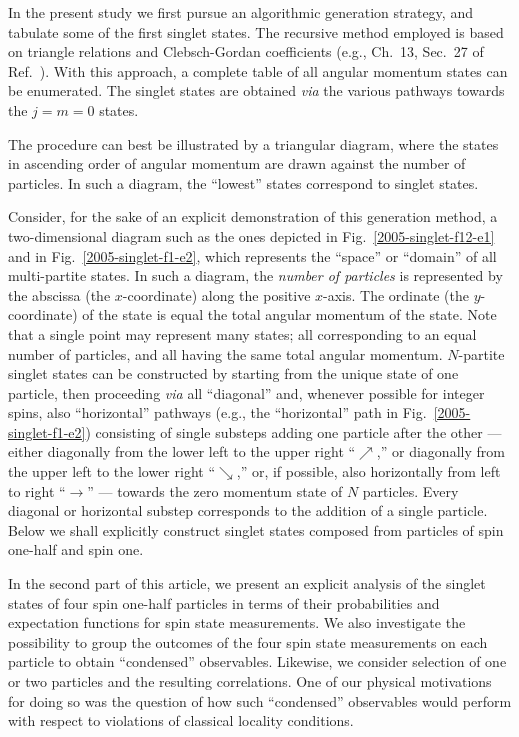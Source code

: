 \documentclass[rmp,amsfonts,showpacs,showkeys,preprint]{revtex4}
\begin{document}
In the present study we first pursue an algorithmic generation strategy,
and tabulate some of the first singlet states. The recursive
method employed is based on triangle relations and
Clebsch-Gordan coefficients (e.g., Ch.~13, Sec.~27 of
Ref.~\cite{messiah-62}). With this approach, a complete table of
all angular momentum states can be enumerated.
The singlet states are obtained {\it via}  the various pathways towards the $j = m = 0$ states.

The
procedure can best be illustrated by a triangular diagram, where
the states in ascending order of angular momentum are drawn against the number
of particles. In such a diagram, the ``lowest'' states correspond
to singlet states.

Consider, for the sake of an explicit demonstration of this generation method, a two-dimensional diagram such as the ones depicted in Fig.~\ref{2005-singlet-f12-e1}
and in Fig.~\ref{2005-singlet-f1-e2},
which represents the ``space'' or ``domain'' of all multi-partite states.
In such a diagram, the {\em number of particles} is represented by the abscissa (the $x$-coordinate) along the positive $x$-axis.
The ordinate (the $y$-coordinate) of the state is equal the total angular momentum of the state.
Note that a single point may represent many states; all corresponding to an equal number of particles,
and all having the same total angular momentum.
$N$-partite singlet states can be constructed by starting from the unique state of one particle,
then proceeding {\it via} all ``diagonal'' and, whenever possible for integer spins,
also ``horizontal'' pathways (e.g., the ``horizontal'' path in Fig.~\ref{2005-singlet-f1-e2})
consisting of single substeps adding one particle after the other
--- either diagonally from the lower left to the upper right ``{\color{blue}$\nearrow$},''
or diagonally from the upper left to the lower right ``{\color{blue}$\searrow$},''
or, if possible, also horizontally from left to right ``{\color{blue}$\rightarrow$}'' ---
towards the zero momentum state of $N$ particles.
Every diagonal or horizontal substep corresponds to the addition of a single particle.
Below we shall explicitly construct singlet states composed from particles of spin one-half and spin one.

In the second part of this article, we present an explicit analysis of the singlet states of
four spin one-half particles in terms of their probabilities and
expectation functions for spin state measurements.
We also investigate the possibility to group the outcomes
of the four spin state measurements on each particle to obtain ``condensed''
observables. Likewise, we consider selection of one or two particles and the resulting
correlations.
One of our physical motivations for doing so was the question of how such ``condensed'' observables
would perform with respect to violations of classical locality conditions.
\end{document}
